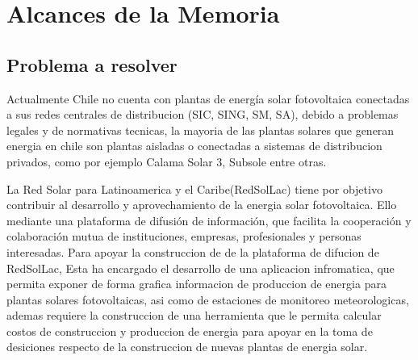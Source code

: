 \chapter{Alcances de la Memoria}
\label{alcansces}

\section{Problema a resolver}

Actualmente Chile no cuenta con plantas de energía solar fotovoltaica conectadas a sus redes centrales de distribucion (SIC, SING, SM, SA), debido a problemas legales y de normativas tecnicas, la mayoria de las plantas solares que generan energia en chile son plantas aisladas o conectadas a sistemas de distribucion privados, como por ejemplo Calama Solar 3\cite{plantaSolar:1}, Subsole\cite{subsole:2,} entre otras.

La Red Solar para Latinoamerica y el Caribe(RedSolLac) tiene por objetivo contribuir al desarrollo y aprovechamiento de la energia solar fotovoltaica. Ello mediante una plataforma de difusión de información, que facilita la cooperación y colaboración mutua de instituciones, empresas, profesionales y personas interesadas.
Para apoyar la construccion de de la plataforma de difucion de RedSolLac, Esta ha encargado el desarrollo de una aplicacion infromatica, que permita exponer de forma grafica informacion de produccion de energia para plantas solares fotovoltaicas, asi como de estaciones de monitoreo meteorologicas, ademas requiere la construccion de una herramienta que le permita calcular costos de construccion y produccion de energia para apoyar en la toma de desiciones respecto de la construccion de nuevas plantas de energia solar.


